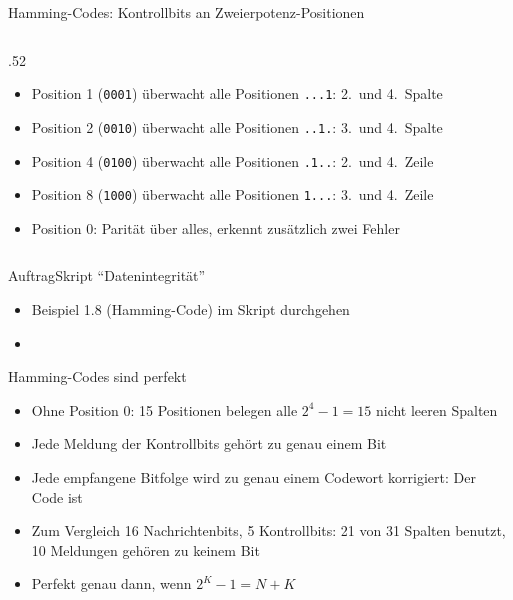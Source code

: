 \begin{frame}{Hamming-Codes: Kontrollbits an Zweierpotenz-Positionen}
\begin{columns}
\begin{column}{.52\textwidth}
\begin{itemize}
                \item<2-> Position 1 (\texttt{0001}) überwacht alle Positionen \texttt{...1}: 2.\ und 4.\ Spalte
                \item<3-> Position 2 (\texttt{0010}) überwacht alle Positionen \texttt{..1.}: 3.\ und 4.\ Spalte
                \item<4-> Position 4 (\texttt{0100}) überwacht alle Positionen \texttt{.1..}: 2.\ und 4.\ Zeile
                \item<5-> Position 8 (\texttt{1000}) überwacht alle Positionen \texttt{1...}: 3.\ und 4.\ Zeile
                \item<6-> Position 0: Parität über alles, erkennt zusätzlich zwei Fehler
            \end{itemize}
        \end{column}
    \end{columns}
\end{frame}


\begin{frame}{Auftrag}{Skript \enquote{Datenintegrität}}
    \begin{itemize}
        \item Beispiel 1.8 (Hamming-Code) im Skript durchgehen
        \item {}
    \end{itemize}
\end{frame}


\begin{frame}{Hamming-Codes sind perfekt}
    \begin{itemize}[<+->]
        \item Ohne Position 0: 15 Positionen belegen alle \(2^4-1=15\) nicht leeren Spalten
        \item Jede Meldung der Kontrollbits gehört zu genau einem Bit
        \item Jede empfangene Bitfolge wird zu genau einem Codewort korrigiert: Der Code ist 
        \item Zum Vergleich 16 Nachrichtenbits, 5 Kontrollbits: 21 von 31 Spalten benutzt, 10 Meldungen gehören zu keinem Bit
        \item Perfekt genau dann, wenn \(2^K-1=N+K\)
    \end{itemize}
\end{frame}


